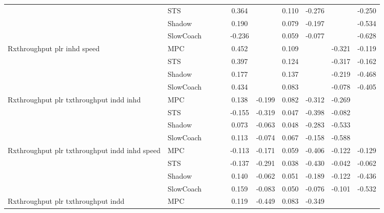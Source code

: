 \begin{tabular}{|l|l|*{9}{c|}}
                              & STS &       &        &        &  0.364 &     &  0.110 &  -0.276 &      &   -0.250 \\
                              & Shadow &       &        &        &  0.190 &     &  0.079 &  -0.197 &      &   -0.534 \\
                              & SlowCoach &       &        &        & -0.236 &     &  0.059 &  -0.077 &      &   -0.628 \\
\midrule
Rxthroughput plr inhd speed    & MPC &       &        &        &  0.452 &     &  0.109 &      &  -0.321 &   -0.119 \\
                              & STS &       &        &        &  0.397 &     &  0.124 &      &  -0.317 &   -0.162 \\
                              & Shadow &       &        &        &  0.177 &     &  0.137 &      &  -0.219 &   -0.468 \\
                              & SlowCoach &       &        &        &  0.434 &     &  0.083 &      &  -0.078 &   -0.405 \\
\midrule
Rxthroughput plr txthroughput indd inhd    & MPC &       &        &        &  0.138 & -0.199 &  0.082 &  -0.312 &  -0.269 &       \\
                              & STS &       &        &        & -0.155 & -0.319 &  0.047 &  -0.398 &  -0.082 &       \\
                              & Shadow &       &        &        &  0.073 & -0.063 &  0.048 &  -0.283 &  -0.533 &       \\
                              & SlowCoach &       &        &        &  0.113 & -0.074 &  0.067 &  -0.158 &  -0.588 &       \\
\midrule
Rxthroughput plr txthroughput indd inhd speed    & MPC &       &        &        & -0.113 & -0.171 &  0.059 &  -0.406 &  -0.122 &   -0.129 \\
                              & STS &       &        &        & -0.137 & -0.291 &  0.038 &  -0.430 &  -0.042 &   -0.062 \\
                              & Shadow &       &        &        &  0.140 & -0.062 &  0.051 &  -0.189 &  -0.122 &   -0.436 \\
                              & SlowCoach &       &        &        &  0.159 & -0.083 &  0.050 &  -0.076 &  -0.101 &   -0.532 \\
\midrule
Rxthroughput plr txthroughput indd    & MPC &       &        &        &  0.119 & -0.449 &  0.083 &  -0.349 &      &       \\

\end{tabular}
